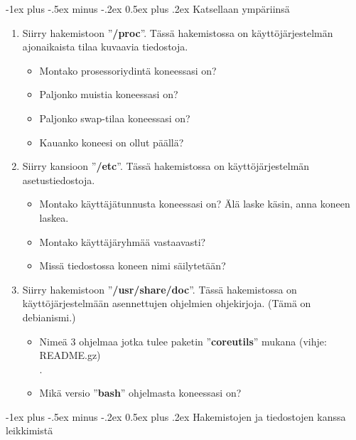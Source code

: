 \documentclass[12pt,portrait,a4]{article}
\makeatletter
\renewcommand{\section}{\@startsection{section}{1}{0mm}%
                                {-1ex plus -.5ex minus -.2ex}%
                                {0.5ex plus .2ex}%
                                {\normalfont\large\bfseries}}
\makeatother
\begin{document}
\section{Katsellaan ympäriinsä}

\begin{enumerate}
\item Siirry hakemistoon ''\textbf{/proc}''.  Tässä hakemistossa on käyttöjärjestelmän
ajonaikaista tilaa kuvaavia tiedostoja.
	\begin{itemize}
	\item Montako prosessoriydintä koneessasi on? \hrulefill
	\item Paljonko muistia koneessasi on? \hrulefill
	\item Paljonko swap-tilaa koneessasi on? \hrulefill
	\item Kauanko koneesi on ollut päällä? \hrulefill
	\end{itemize}

\item Siirry kansioon ''\textbf{/etc}''.  Tässä hakemistossa on käyttöjärjestelmän
asetustiedostoja.
	\begin{itemize}
	\item Montako käyttäjätunnusta koneessasi on?  Älä laske käsin, anna
koneen laskea. \hrulefill
	\item Montako käyttäjäryhmää vastaavasti? \hrulefill
	\item Missä tiedostossa koneen nimi säilytetään? \hrulefill
	\end{itemize}

\item Siirry hakemistoon ''\textbf{/usr/share/doc}''.  Tässä hakemistossa on
käyttöjärjestelmään asennettujen ohjelmien ohjekirjoja.  (Tämä on debianismi.)
	\begin{itemize}
	\item Nimeä 3 ohjelmaa jotka tulee paketin ''\textbf{coreutils}'' mukana (vihje: README.gz)
\\ . \hrulefill
	\item Mikä versio ''\textbf{bash}'' ohjelmasta koneessasi on?
\hrulefill
	\end{itemize}
\end{enumerate}

\section{Hakemistojen ja tiedostojen kanssa leikkimistä}
\end{document}
